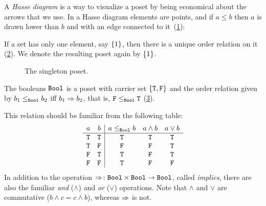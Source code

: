 A \emph{Hasse diagram} is a way to visualize a poset by being economical about the arrows that we use. In a Hasse diagram elements are points, and if $a \leq b$ then $a$ is drawn lower than $b$ and with an edge connected to it~(\cref{fig:hasse}):

\begin{figure}[h!]
   \centering
   \caption{\label{fig:hasse}}
\end{figure}

\begin{example}\label{ex:singleton}
If a set has only one element, say $\{1\}$, then there is a unique order relation on it (\cref{fig:singleton}). We denote the resulting poset again by $\{1\}$.
\end{example}
\begin{figure}[h!]
   \centering
   \caption{The singleton poset.\label{fig:singleton}}
\end{figure}


\begin{example}[Booleans]\label{ex:bool}
The booleans $\mathtt{Bool}$ is a poset with carrier set $\{\mathtt{T},\mathtt{F}\}$ and the order relation given by $b_1 \leq_\mathtt{Bool} b_2$ iff $b_1 \Rightarrow b_2$, that is, $\mathtt{F} \leq_\mathtt{Bool} \mathtt{T}$ (\cref{fig:boolean}).

\begin{figure}[h!]
   \centering
   \caption{\label{fig:boolean}}
\end{figure}

This relation should be familiar from the following table:
\begin{equation}
\begin{array}{cc|ccc}
a & b & a \leq_\mathtt{Bool} b & a \wedge b & a \vee b \\ \hline
\mathtt{T}&\mathtt{T}&\mathtt{T}&\mathtt{T}&\mathtt{T}\\
\mathtt{T}&\mathtt{F}&\mathtt{F}&\mathtt{F}&\mathtt{T}\\
\mathtt{F}&\mathtt{T}&\mathtt{T}&\mathtt{F}&\mathtt{T}\\
\mathtt{F}&\mathtt{F}&\mathtt{T}&\mathtt{F}&\mathtt{F}
\end{array}
\end{equation}
In addition to the operation $\Rightarrow\colon\mathtt{Bool}\times \mathtt{Bool}\to\mathtt{Bool}$, called \emph{implies}, there are also the familiar \emph{and} ($\wedge$) and \emph{or} ($\vee$) operations. Note that $\wedge$ and $\vee$ are commutative ($b\wedge c = c\wedge b$), whereas $\Rightarrow$ is not.
\end{example}




